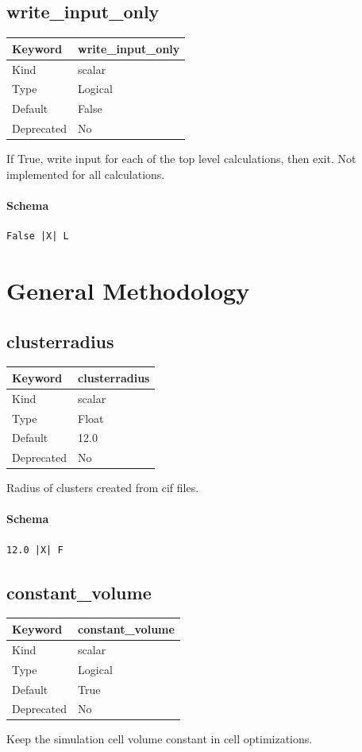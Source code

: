 \documentclass[11pt]{article}
\begin{document}
\subsection{write\_input\_only}
\label{kw:write-input-only}
\begin{longtable}{|p{1.5in}|p{4.5in}|}
\hline
Keyword & write\_input\_only \\
\hline
Kind & scalar \\
\hline
Type & Logical \\
\hline
Default & False \\
\hline
Deprecated & No \\
\hline
\end{longtable}
 If True, write input for each of the top level calculations, then exit.
 Not implemented for all calculations.

\paragraph{Schema}
\begin{Verbatim}
False |X| L
\end{Verbatim}

\section{General Methodology}

\subsection{clusterradius}
\label{kw:clusterradius}
\begin{longtable}{|p{1.5in}|p{4.5in}|}
\hline
Keyword & clusterradius \\
\hline
Kind & scalar \\
\hline
Type & Float \\
\hline
Default & 12.0 \\
\hline
Deprecated & No \\
\hline
\end{longtable}
 Radius of clusters created from cif files.

\paragraph{Schema}
\begin{Verbatim}
12.0 |X| F
\end{Verbatim}

\subsection{constant\_volume}
\label{kw:constant-volume}
\begin{longtable}{|p{1.5in}|p{4.5in}|}
\hline
Keyword & constant\_volume \\
\hline
Kind & scalar \\
\hline
Type & Logical \\
\hline
Default & True \\
\hline
Deprecated & No \\
\hline
\end{longtable}
 Keep the simulation cell volume constant in cell optimizations.
\end{document}
